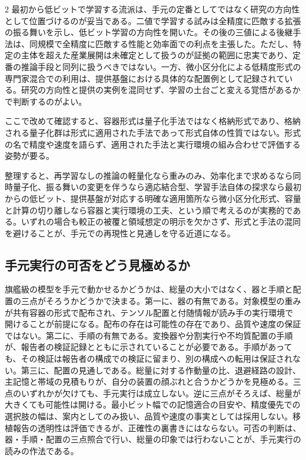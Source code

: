 \documentclass[lualatex,a4paper,10pt]{jlreq}
\begin{document}
\begin{multicols}{2}
最初から低ビットで学習する流派は、手元の定番としてではなく研究の方向性として位置づけるのが妥当である。二値で学習する試みは全精度に匹敵する拡張の振る舞いを示し、低ビット学習の方向性を開いた\autocite{bitnet}。その後の三値による後継手法は、同規模で全精度に匹敵する性能と効率面での利点を主張した\autocite{bitnet158}。ただし、特定の主体を超えた産業展開は未確定として扱うのが証拠の範囲に忠実であり、定番の推論手段と同列に扱うべきではない。一方、微小区分化による低精度形式の専門家混合での利用は、提供基盤における具体的な配置例として記録されている\autocite{mxfp4}。研究の方向性と提供の実例を混同せず、学習の土台ごと変える覚悟があるかで判断するのがよい。

ここで改めて確認すると、容器形式は量子化手法ではなく格納形式であり、格納される量子化群は形式に適用された手法であって形式自体の性質ではない\autocite{gguf}。形式の名で精度や速度を語らず、適用された手法と実行環境の組み合わせで評価する姿勢が要る。

整理すると、再学習なしの推論の軽量化なら重みのみ、効率化まで求めるなら同時量子化、振る舞いの変更を伴うなら適応結合型、学習手法自体の探求なら最初からの低ビット、提供基盤が対応する明確な適用箇所なら微小区分化形式、容量と計算の切り離しなら容器と実行環境の工夫、という順で考えるのが実務的である。いずれの場合も較正の被覆と領域想定の明示を欠かさず、形式と手法の混同を避けることが、手元での再現性と見通しを守る近道になる。

\subsection{手元実行の可否をどう見極めるか}
旗艦級の模型を手元で動かせるかどうかは、総量の大小ではなく、器と手順と配置の三点がそろうかどうかで決まる。第一に、器の有無である。対象模型の重みが共有容器の形式で配布され、テンソル配置と付随情報が読み手の実行環境で開けることが前提になる\autocite{gguf}\autocite{unslothglm}。配布の存在は可能性の存在であり、品質や速度の保証ではない。第二に、手順の有無である。変換器や分割実行や不均質配置の手順が、報告者の検証記録とともに示されていることが必要である\autocite{llamacpp}\autocite{qwenpr}。手順があっても、その検証は報告者の構成での検証に留まり、別の構成への転用は保証されない。第三に、配置の見通しである。総量に対する作動量の比、退避経路の設計、主記憶と帯域の見積もりが、自分の装置の顔ぶれと合うかどうかを見極める\autocite{ktransformers}。三点のいずれかが欠けても、手元実行は成立しない。逆に三点がそろえば、総量が大きくても可能性は開ける。最小ビット幅での記憶適合の目安や、精度優先での選択肢の幅は、案内としてのみ扱い、品質や速度の事実としては採用しない\autocite{unslothglm}。移植報告の透明性は評価できるが、正確性の裏書きにはならない\autocite{qwenpr}。可否の判断は、器・手順・配置の三点照合で行い、総量の印象では行わないことが、手元実行の読みの作法である。

\end{multicols}
\end{document}
